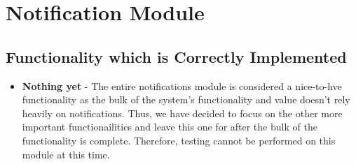 \documentclass[11pt,fleqn]{book} %
\begin{document}
	\section{Notification Module}
		\subsection{Functionality which is Correctly Implemented}
			\begin{itemize}
				\item\textbf{Nothing yet} -
				The entire notifications module is considered a nice-to-hve functionality as the bulk of the system's functionality and value doesn't rely heavily on notifications. Thus, we have decided to focus on the other more important functionailities and leave this one for after the bulk of the functionality is complete. Therefore, testing cannot be performed on this module at this time.
			\end{itemize}
%				
%				
%				
\end{document}
